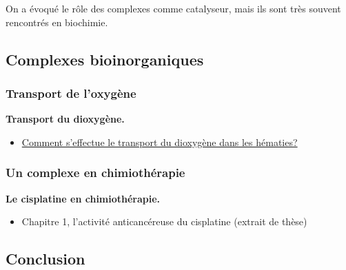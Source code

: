 \begin{transition}
On a évoqué le rôle des complexes comme catalyseur, mais ils sont très souvent rencontrés en biochimie.
\end{transition}

\subsection{Complexes bioinorganiques}

\subsubsection{Transport de l'oxygène}

\begin{slide}
\textbf{Transport du dioxygène.}
\end{slide}

\begin{itemize}
\item \href{https://www.rts.ch/decouverte/sante-et-medecine/corps-humain/9852272-comment-s-effectue-le-transport-du-dioxygene-dans-les-hematies-.html}{Comment s'effectue le transport du dioxygène dans les hématies?}
\end{itemize}

\subsubsection{Un complexe en chimiothérapie}

\begin{slide}
\textbf{Le cisplatine en chimiothérapie.}
\end{slide}
\begin{itemize}
\item Chapitre 1, l'activité anticancéreuse du cisplatine (extrait de thèse)
\end{itemize}

\subsection*{Conclusion}

\newpage